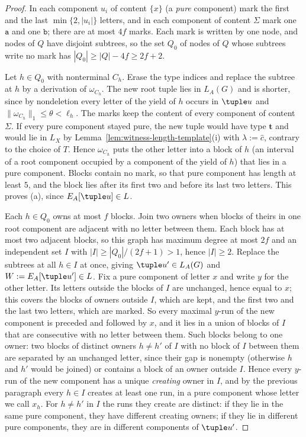 \begin{proof}
In each component $u_i$ of content $\{x\}$ (a \emph{pure} component) mark the
first and the last $\min\{2,|u_i|\}$ letters, and in each component of content
$\Sigma$ mark one $\mathtt a$ and one $\mathtt b$; there are at most $4f$ marks.
Each mark is written by one node, and nodes of $Q$ have disjoint subtrees, so
the set $Q_0$ of nodes of $Q$ whose subtrees write no mark has
$|Q_0|\ge|Q|-4f\ge2f+2$.

Let $h\in Q_0$ with nonterminal $C_h$.  Erase the type indices and replace the
subtree at $h$ by a derivation of $\omega_{C_h}$.  The new root tuple lies in
$L_A(G)$ and is shorter, since by nondeletion every letter of the yield of $h$
occurs in $\tuple u$ and $\|\omega_{C_h}\|_1\le\theta<\ell_h$.  The marks keep the
content of every component of content $\Sigma$.  If every pure component stayed
pure, the new tuple would have type $\mathbf t$ and would lie in $L_X$ by
Lemma~\ref{lem:witness-length-template}(i) with $\lambda:=\widehat c$, contrary to
the choice of $T$.  Hence $\omega_{C_h}$ puts the other letter into a block of $h$
(an interval of a root component occupied by a component of the yield of $h$)
that lies in a pure component.  Blocks contain no mark, so that pure component
has length at least $5$, and the block lies after its first two and before its
last two letters.  This proves (a), since $E_A[\tuple u]\in L$.

Each $h\in Q_0$ owns at most $f$ blocks.  Join two owners when blocks of theirs in
one root component are adjacent with no letter between them.  Each block has at
most two adjacent blocks, so this graph has maximum degree at most $2f$ and an
independent set $I$ with $|I|\ge|Q_0|/(2f+1)>1$, hence $|I|\ge2$.  Replace the subtrees at
all $h\in I$ at once, giving $\tuple u'\in L_A(G)$ and $W:=E_A[\tuple u']\in L$.
Fix a pure component of letter $x$ and write $y$ for the other letter.  Its
letters outside the blocks of $I$ are unchanged, hence equal to $x$; this
covers the blocks of owners outside $I$, which are kept, and the first two and
the last two letters, which are marked.  So every maximal $y$-run of the new
component is preceded and followed by $x$, and it lies in a union of blocks of
$I$ that are consecutive with no letter between them.  Such blocks belong to one
owner: two blocks of distinct owners $h\ne h'$ of $I$ with no block of $I$
between them are separated by an unchanged letter, since their gap is nonempty
(otherwise $h$ and $h'$ would be joined) or contains a block of an owner outside
$I$.  Hence every $y$-run of the new component has a unique \emph{creating}
owner in $I$, and by the previous paragraph every $h\in I$ creates at least one
run, in a pure component whose letter we call $x_h$.  For $h\ne h'$ in $I$ the
runs they create are distinct: if they lie in the same pure component, they have
different creating owners; if they lie in different pure components, they are
in different components of $\tuple u'$.


\end{proof}
